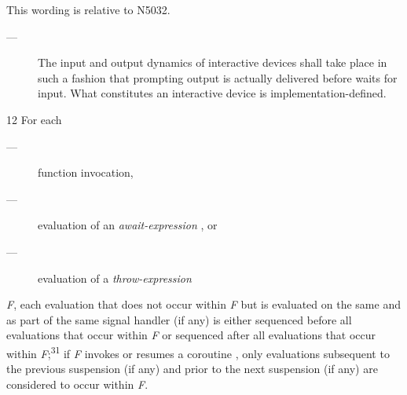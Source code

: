 \newpage
{}\label{api}

This wording is relative to N5032.\cite{Standard}




\begin{description}
    \item[---] The input and output dynamics of interactive devices shall take
               place in such a fashion that prompting output is actually
               delivered before  waits
               for input. What constitutes an interactive device is
               implementation-defined.
\end{description}


12 For each
\begin{description}
    \item[---] function invocation,
    \item[---] evaluation of an \emph{await-expression} , or
    \item[---] evaluation of a \emph{throw-expression} 
\end{description}
\emph{F}, each evaluation that does not occur within \emph{F} but is evaluated on the same
 and as part of the same signal handler (if any) is either sequenced
before all evaluations that occur within \emph{F} or sequenced after all
evaluations that occur within \emph{F};\textsuperscript{31} if \emph{F} invokes or resumes
a coroutine , only evaluations subsequent to the previous
suspension (if any) and prior to the next suspension (if any) are considered
to occur within \emph{F}.


\\


